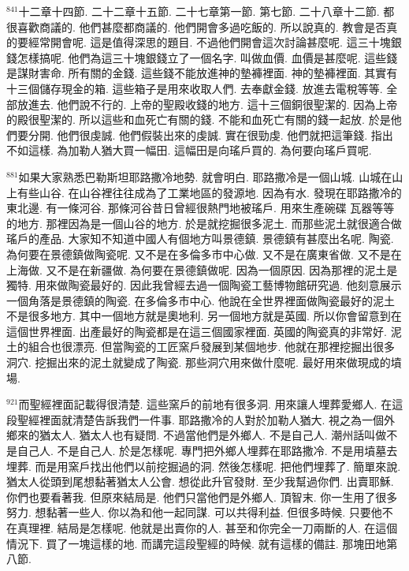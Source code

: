 \documentclass{book}
\begin{document}
$^{841}$十二章十四節.
二十二章十五節.
二十七章第一節.
第七節.
二十八章十二節.
都很喜歡商議的.
他們甚麼都商議的.
他們開會多過吃飯的.
所以說真的.
教會是否真的要經常開會呢.
這是值得深思的題目.
不過他們開會這次討論甚麼呢.
這三十塊銀錢怎樣搞呢.
他們為這三十塊銀錢立了一個名字.
叫做血價.
血價是甚麼呢.
這些錢是謀財害命.
所有關的金錢.
這些錢不能放進神的墊褲裡面.
神的墊褲裡面.
其實有十三個儲存現金的箱.
這些箱子是用來收取人們.
去奉獻金錢.
放進去電稅等等.
全部放進去.
他們說不行的.
上帝的聖殿收錢的地方.
這十三個銅很聖潔的.
因為上帝的殿很聖潔的.
所以這些和血死亡有關的錢.
不能和血死亡有關的錢一起放.
於是他們要分開.
他們很虔誠.
他們假裝出來的虔誠.
實在很勁虔.
他們就把這筆錢.
指出不如這樣.
為加勒人猶大買一幅田.
這幅田是向瑤戶買的.
為何要向瑤戶買呢.

$^{881}$如果大家熟悉巴勒斯坦耶路撒冷地勢.
就會明白.
耶路撒冷是一個山城.
山城在山上有些山谷.
在山谷裡往往成為了工業地區的發源地.
因為有水.
發現在耶路撒冷的東北邊.
有一條河谷.
那條河谷昔日曾經很熱門地被瑤戶.
用來生產碗碟 瓦器等等的地方.
那裡因為是一個山谷的地方.
於是就挖掘很多泥土.
而那些泥土就很適合做瑤戶的產品.
大家知不知道中國人有個地方叫景德鎮.
景德鎮有甚麼出名呢.
陶瓷.
為何要在景德鎮做陶瓷呢.
又不是在多倫多市中心做.
又不是在廣東省做.
又不是在上海做.
又不是在新疆做.
為何要在景德鎮做呢.
因為一個原因.
因為那裡的泥土是獨特.
用來做陶瓷最好的.
因此我曾經去過一個陶瓷工藝博物館研究過.
他刻意展示一個角落是景德鎮的陶瓷.
在多倫多市中心.
他說在全世界裡面做陶瓷最好的泥土不是很多地方.
其中一個地方就是奧地利.
另一個地方就是英國.
所以你會留意到在這個世界裡面.
出產最好的陶瓷都是在這三個國家裡面.
英國的陶瓷真的非常好.
泥土的組合也很漂亮.
但當陶瓷的工匠窯戶發展到某個地步.
他就在那裡挖掘出很多洞穴.
挖掘出來的泥土就變成了陶瓷.
那些洞穴用來做什麼呢.
最好用來做現成的墳場.

$^{921}$而聖經裡面記載得很清楚.
這些窯戶的前地有很多洞.
用來讓人埋葬愛鄉人.
在這段聖經裡面就清楚告訴我們一件事.
耶路撒冷的人對於加勒人猶大.
視之為一個外鄉來的猶太人.
猶太人也有疑問.
不過當他們是外鄉人.
不是自己人.
潮州話叫做不是自己人.
不是自己人.
於是怎樣呢.
專門把外鄉人埋葬在耶路撒冷.
不是用墳墓去埋葬.
而是用窯戶找出他們以前挖掘過的洞.
然後怎樣呢.
把他們埋葬了.
簡單來說.
猶太人從頭到尾想黏著猶太人公會.
想從此升官發財.
至少我幫過你們.
出賣耶穌.
你們也要看著我.
但原來結局是.
他們只當他們是外鄉人.
頂智末.
你一生用了很多努力.
想黏著一些人.
你以為和他一起同謀.
可以共得利益.
但很多時候.
只要他不在真理裡.
結局是怎樣呢.
他就是出賣你的人.
甚至和你完全一刀兩斷的人.
在這個情況下.
買了一塊這樣的地.
而講完這段聖經的時候.
就有這樣的備註.
那塊田地第八節.
\end{document}

